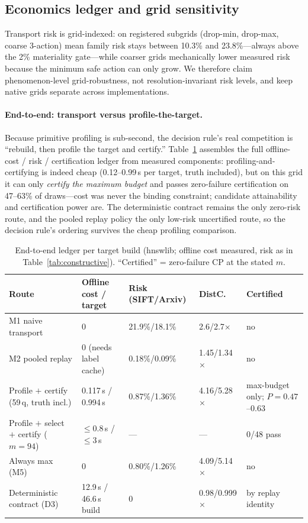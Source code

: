 \documentclass{article}
\begin{document}
\subsection{Economics ledger and grid sensitivity}

Transport risk is grid-indexed: on registered subgrids (drop-min, drop-max, coarse 3-action) mean family
risk stays between 10.3\% and 23.8\%---always above the 2\% materiality gate---while coarser grids
mechanically lower measured risk because the minimum safe action can only grow. We therefore claim
phenomenon-level grid-robustness, not resolution-invariant risk levels, and keep native grids separate
across implementations.

\paragraph{End-to-end: transport versus profile-the-target.}
Because primitive profiling is sub-second, the decision rule's real competition is ``rebuild, then profile
the target and certify.'' Table~\ref{tab:e2e} assembles the full offline-cost / risk / certification
ledger from measured components: profiling-and-certifying is indeed cheap (0.12--0.99\,s per target,
truth included), but on this grid it can only \emph{certify the maximum budget} and passes zero-failure
certification on 47--63\% of draws---cost was never the binding constraint; candidate attainability and
certification power are. The deterministic contract remains the only zero-risk route, and the pooled
replay policy the only low-risk uncertified route, so the decision rule's ordering survives the cheap
profiling comparison.

\begin{table}[t]
\centering
\caption{End-to-end ledger per target build (hnswlib; offline cost measured, risk as in
Table~\ref{tab:constructive}). ``Certified'' = zero-failure CP at the stated $m$.}
\label{tab:e2e}
\footnotesize
\setlength{\tabcolsep}{3pt}
\begin{tabular}{p{3.1cm}p{2.6cm}p{2.6cm}p{1.4cm}p{2.4cm}}
\toprule
Route & Offline cost / target & Risk (SIFT/Arxiv) & DistC. & Certified \\
\midrule
M1 naive transport & 0 & 21.9\%/18.1\% & 2.6/2.7$\times$ & no \\
M2 pooled replay & 0 (needs label cache) & 0.18\%/0.09\% & 1.45/1.34$\times$ & no \\
Profile $+$ certify (59\,q, truth incl.) & 0.117\,s / 0.994\,s & 0.87\%/1.36\% & 4.16/5.28$\times$ & max-budget only; $P{=}0.47$--$0.63$ \\
Profile $+$ select $+$ certify ($m{=}94$) & $\le$0.8\,s / $\le$3\,s & --- & --- & 0/48 pass \\
Always max (M5) & 0 & 0.80\%/1.26\% & 4.09/5.14$\times$ & no \\
Deterministic contract (D3) & 12.9\,s / 46.6\,s build & 0 & 0.98/0.999$\times$ & by replay identity \\
\bottomrule
\end{tabular}
\end{table}
\end{document}
